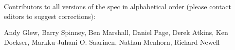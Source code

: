 
%
%

\noindent
Contributors to all versions of the spec in
alphabetical order (please contact editors to suggest
corrections):

Andy Glew,
Barry Spinney,
Ben Marshall,
Daniel Page,
Derek Atkins,
Ken Dockser,
Markku-Juhani O. Saarinen,
Nathan Menhorn,
Richard Newell

